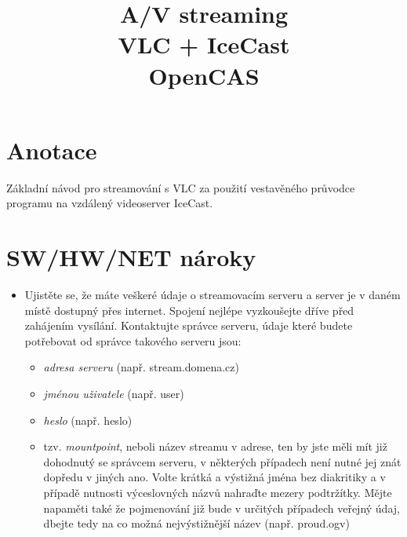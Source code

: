 \documentclass[11pt]{article} %
\title{A/V streaming \\ VLC + IceCast \\ {\small OpenCAS}}
\date{} %
\begin{document}
\maketitle


\section{Anotace}

Základní návod pro streamování s VLC za použití vestavěného průvodce programu na vzdálený videoserver IceCast.

\section{SW/HW/NET nároky}

\begin{itemize}
\item{Ujistěte se, že máte veškeré údaje o streamovacím serveru a server je v daném místě dostupný přes internet. Spojení nejlépe vyzkoušejte dříve před zahájením vysílání. Kontaktujte správce serveru, údaje které budete potřebovat od správce takového serveru jsou:}
\begin{itemize}
\item{{\em adresa serveru} (např. stream.domena.cz)}
\item{{\em jménou uživatele} (např. user)}
\item{{\em heslo} (např. heslo)}
\item{tzv. {\em mountpoint}, neboli název streamu v adrese, ten by jste měli mít již dohodnutý se správcem serveru, v některých případech není nutné jej znát dopředu v jiných ano. Volte krátká a výstižná jména bez diakritiky a v případě nutnosti výceslovných názvů nahraďte mezery podtržítky. Mějte napaměti také že pojmenování již bude v určitých případech veřejný údaj, dbejte tedy na co možná nejvýstižnější název (např. proud.ogv)}



\end{itemize}


\end{itemize}
\end{document}
